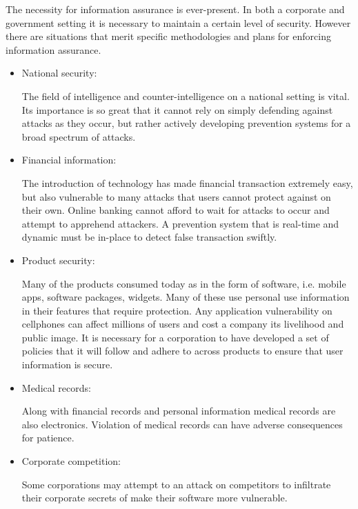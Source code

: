 \documentclass[11pt]{article}
\begin{document}
\begin{flushleft}

The necessity for information assurance is ever-present. In both a corporate and government setting it is necessary to maintain a certain level of security. However there are situations that merit specific methodologies and plans for enforcing information assurance. 

\begin{itemize}

\item National security:

The field of intelligence and counter-intelligence on a national setting is vital. Its importance is so great that it cannot rely on simply defending against attacks as they occur, but rather actively developing prevention systems for a broad spectrum of attacks. 

\item Financial information:

The introduction of technology has made financial transaction extremely easy, but also vulnerable to many attacks that users cannot protect against on their own. Online banking cannot afford to wait for attacks to occur and attempt to apprehend attackers. A prevention system that is real-time and dynamic must be in-place to detect false transaction swiftly.

\item Product security:

Many of the products consumed today as in the form of software, i.e. mobile apps, software packages, widgets. Many of these use personal use information in their features that require protection. Any application vulnerability on cellphones can affect millions of users and cost a company its livelihood and public image. It is necessary for a corporation to have developed a set of policies that it will follow and adhere to across products to ensure that user information is secure. 

\item Medical records:

Along with financial records and personal information medical records are also electronics. Violation of medical records can have adverse consequences for patience. 

\item Corporate competition:

Some corporations may attempt to an attack on competitors to infiltrate their corporate secrets of make their software more vulnerable. 

\end{itemize}

\end{flushleft}
\end{document}
